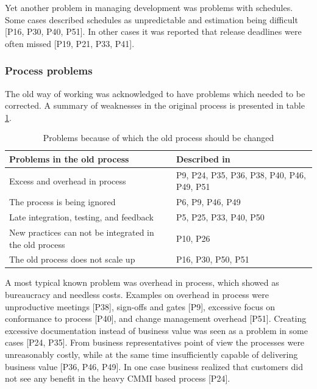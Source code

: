 \documentclass[preprint,authoryear,12pt]{elsarticle}
\begin{document}
Yet another problem in managing development was problems with schedules.
Some cases described schedules as unpredictable and estimation being difficult
[P16, P30, P40, P51]. In other cases it was reported that release deadlines were
often missed [P19, P21, P33, P41].

\subsubsection{Process problems}

The old way of working was acknowledged to have problems which needed to be
corrected. A summary of weaknesses in the original process is presented in table
\ref{table:reasonstochange_process}.

\begin{table}[b]
    \centering
    \begin{tabular}{ >{\raggedright\arraybackslash}p{}
                     >{\raggedright\arraybackslash}p{} }
        \toprule
        Problems in the old process           &  Described in  \\
        \midrule
        Excess and overhead in process     &  P9, P24, P35, P36, P38, P40, P46, P49, P51  \\
        The process is being ignored       &  P6, P9, P46, P49  \\
        Late integration, testing, and feedback  &  P5, P25, P33, P40, P50  \\
        New practices can not be integrated in the old process  &  P10, P26  \\
        The old process does not scale up  &  P16, P30, P50, P51  \\
        \bottomrule
    \end{tabular}
    \caption{Problems because of which the old process should be changed}
    \label{table:reasonstochange_process}
\end{table}

A most typical known problem was overhead in process, which showed as bureaucracy and
needless costs. Examples on overhead in process were unproductive meetings
[P38], sign-offs and gates [P9], excessive focus on conformance to process
[P40], and change management overhead [P51]. Creating excessive documentation
instead of business value was seen as a problem in some cases [P24, P35]. From
business representatives point of view the processes were unreasonably costly,
while at the same time insufficiently capable of delivering business value [P36,
P46, P49]. In one case business realized that customers did not see any benefit
in the heavy CMMI based process [P24].
\end{document}
